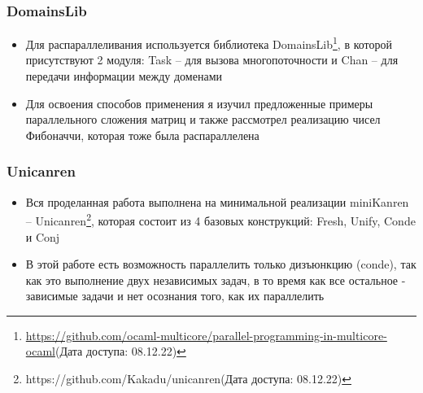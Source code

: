 \documentclass{beamer}
\newtheorem{rutheorem}{Теорема}
\begin{document}
  
\begin{frame}
  \frametitle{DomainsLib}
  \begin{itemize}
  \item Для распараллеливания используется библиотека DomainsLib\footnote{\url{https://github.com/ocaml-multicore/parallel-programming-in-multicore-ocaml}(Дата доступа: 08.12.22)}, 
  в которой присутствуют 2 модуля: Task -- для вызова многопоточности и Chan -- для передачи информации между доменами
  \item Для освоения способов применения я изучил предложенные примеры параллельного сложения матриц и также рассмотрел реализацию чисел Фибоначчи, которая тоже была распараллелена
  \end{itemize}
\end{frame}






\begin{frame}
  \frametitle{Unicanren}
  \begin{itemize}
  \item Вся проделанная работа выполнена на минимальной реализации miniKanren -- Unicanren\footnote{{https://github.com/Kakadu/unicanren}(Дата доступа: 08.12.22)}, которая состоит из 4 базовых конструкций: Fresh, Unify, Conde и Conj
  \item В этой работе есть возможность параллелить только дизъюнкцию (conde), так как это выполнение двух независимых задач, в то время как все остальное - зависимые задачи и нет осознания того, как их параллелить
  
  \end{itemize}
  \end{frame}
\end{document}
